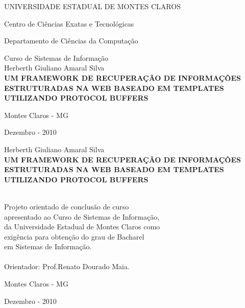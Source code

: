 \documentclass[a4paper]{report}
\begin{document}
\begin{titlepage}
\begin{center}
UNIVERSIDADE ESTADUAL DE MONTES CLAROS

Centro de Ciências Exatas e Tecnológicas

Departamento de Ciências da Computação

Curso de Sistemas de Informação
\\[2cm]
Herberth Giuliano Amaral Silva
\\[7cm]
\textbf {UM FRAMEWORK DE RECUPERAÇÃO DE INFORMAÇÕES ESTRUTURADAS NA WEB BASEADO EM TEMPLATES UTILIZANDO PROTOCOL BUFFERS}

\vfill
Montes Claros - MG

Dezembro - 2010



\end{center}
\end{titlepage}

\thispagestyle{empty}
\addtocounter{page}{-1}

\begin{center}
	Herberth Giuliano Amaral Silva
	\\[10cm]
	\textbf{UM FRAMEWORK DE RECUPERAÇÃO DE INFORMAÇÕES ESTRUTURADAS NA WEB BASEADO EM TEMPLATES UTILIZANDO PROTOCOL BUFFERS}
		
	\begin{flushright} 
	\ \\[3cm]
	Projeto orientado de conclusão de curso \\
	apresentado ao Curso de Sistemas de Informação, \\
	da Universidade Estadual de Montes Claros como \\
	exigência para obtenção do grau de Bacharel \\
	em Sistemas de Informação. \\
 	\ \\[1cm]
	Orientador: Prof.Renato Dourado Maia.

	\end{flushright}
	
	\vfill
	Montes Claros - MG
	
	Dezembro - 2010 
\end{center}


\renewcommand{\contentsname}{Índice}
\renewcommand{\chaptername}{Capítulo}
\renewcommand{\bibname}{Bibliografia}
\renewcommand{\lstlistingname}{Listagem}

\def\us{\char`\_}

\tableofcontents

\doublespacing


\clearpage
{}


\end{document}
